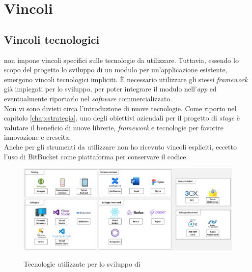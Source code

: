 \section{Vincoli}
\subsection{Vincoli tecnologici}\label{chap:vincoli tec}

{\company} non impone vincoli specifici sulle tecnologie da utilizzare. Tuttavia, essendo lo scopo del progetto lo 
sviluppo di un modulo per un'applicazione esistente, emergono vincoli tecnologici impliciti. È necessario utilizzare gli 
stessi \textit{framework} già impiegati per lo sviluppo, per poter integrare il modulo nell'\textit{app} ed eventualmente 
riportarlo nel \textit{software} commercializzato.\\
Non vi sono divieti circa l'introduzione di nuove tecnologie. Come riporto nel capitolo \ref{chap:strategia}, uno degli obiettivi
aziendali per il progetto di \textit{stage} è valutare il beneficio di nuove librerie, \textit{framework}
e tecnologie per favorire innovazione e crescita.\\
Anche per gli strumenti da utilizzare non ho ricevuto vincoli espliciti, eccetto l'uso di BitBucket
come piattaforma per conservare il codice.

\begin{figure}[H]
      \centering
      \includegraphics[alt={Tecnologie utilizzate per lo sviluppo di {\movi}}, width=\textwidth]{img/vincoli_tec.png}
      \caption[Tecnologie utilizzate per lo sviluppo di {\movi}]
              {Tecnologie utilizzate per lo sviluppo di {\movi}}
      \label{fig:tecnologie movi}
  \end{figure}

